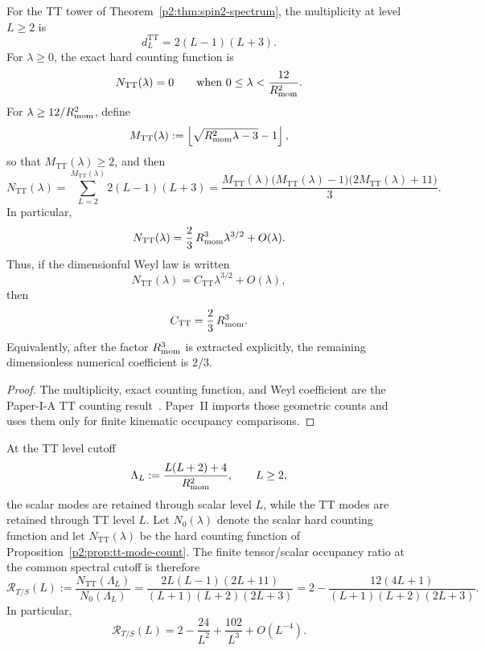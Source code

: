 \documentclass[12pt,a4paper]{article}
\begin{document}
\begin{proposition}
\label{p2:prop:tt-mode-count}
For the TT tower of Theorem~\ref{p2:thm:spin2-spectrum}, the multiplicity at level $L\ge2$ is
\begin{equation}
 d_L^{\mathrm{TT}}=2(L-1)(L+3).
\end{equation}
For \(\lambda\ge0\), the exact hard counting function is
\begin{equation}
N_{\mathrm{TT}}(\lambda)=0
\qquad
\text{when }
0\le\lambda<\frac{12}{R_{\mathrm{mom}}^2}.
\end{equation}
For \(\lambda\ge12/R_{\mathrm{mom}}^2\), define
\begin{equation}
M_{\mathrm{TT}}(\lambda)
:=
\left\lfloor\sqrt{R_{\mathrm{mom}}^2\lambda-3}-1\right\rfloor,
\end{equation}
so that \(M_{\mathrm{TT}}(\lambda)\ge2\), and then
\begin{equation}
N_{\mathrm{TT}}(\lambda)
=\sum_{L=2}^{M_{\mathrm{TT}}(\lambda)}2(L-1)(L+3)
=\frac{
M_{\mathrm{TT}}(\lambda)
\bigl(M_{\mathrm{TT}}(\lambda)-1\bigr)
\bigl(2M_{\mathrm{TT}}(\lambda)+11\bigr)
}{3}.
\end{equation}
In particular,
\begin{equation}
N_{\mathrm{TT}}(\lambda)=\frac23\,R_{\mathrm{mom}}^3\lambda^{3/2}+O(\lambda).
\end{equation}
Thus, if the dimensionful Weyl law is written
\[
N_{\mathrm{TT}}(\lambda)
=C_{\mathrm{TT}}\lambda^{3/2}+O(\lambda),
\]
then
\[
C_{\mathrm{TT}}=\frac23\,R_{\mathrm{mom}}^3.
\]
Equivalently, after the factor \(R_{\mathrm{mom}}^3\) is extracted explicitly, the
remaining dimensionless numerical coefficient is \(2/3\).
\end{proposition}

\begin{proof}
The multiplicity, exact counting function, and Weyl coefficient are
the Paper-I-A TT counting result~\cite{Kugelmann2026a}.  Paper~II imports
those geometric counts and uses them only for finite kinematic occupancy
comparisons.
\end{proof}

\begin{corollary}
\label{p2:cor:finite-tt-scalar-ratio}
At the TT level cutoff
\[
\Lambda_L:=\frac{L(L+2)+4}{R_{\mathrm{mom}}^2},\qquad L\ge2,
\]
the scalar modes are retained through scalar level \(L\), while the TT modes
are retained through TT level \(L\).  Let \(N_0(\lambda)\) denote the scalar
hard counting function and let \(N_{\mathrm{TT}}(\lambda)\) be the hard
counting function of Proposition~\ref{p2:prop:tt-mode-count}.  The finite
tensor/scalar occupancy ratio at the common spectral cutoff is therefore
\begin{equation}
\mathcal R_{T/S}(L)
:=\frac{N_{\mathrm{TT}}(\Lambda_L)}{N_0(\Lambda_L)}
=\frac{2L(L-1)(2L+11)}{(L+1)(L+2)(2L+3)}
=2-\frac{12(4L+1)}{(L+1)(L+2)(2L+3)}.
\end{equation}
In particular,
\begin{equation}
\mathcal R_{T/S}(L)=2-\frac{24}{L^2}+\frac{102}{L^3}+O(L^{-4}).
\end{equation}
\end{corollary}
\end{document}

